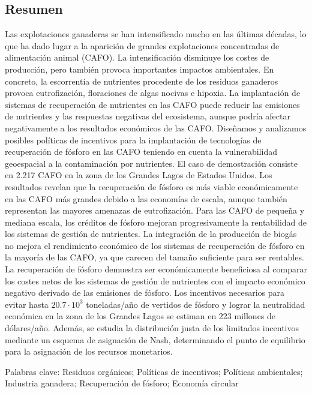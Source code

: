 \begin{refsection}[referencesCh5]
\section*{Resumen}
Las explotaciones ganaderas se han intensificado mucho en las últimas décadas, lo que ha dado lugar a la aparición de grandes explotaciones concentradas de alimentación animal (CAFO). La intensificación disminuye los costes de producción, pero también provoca importantes impactos ambientales. En concreto, la escorrentía de nutrientes procedente de los residuos ganaderos provoca eutrofización, floraciones de algas nocivas e hipoxia. La implantación de sistemas de recuperación de nutrientes en las CAFO puede reducir las emisiones de nutrientes y las respuestas negativas del ecosistema, aunque podría afectar negativamente a los resultados económicos de las CAFO. Diseñamos y analizamos posibles políticas de incentivos para la implantación de tecnologías de recuperación de fósforo en las CAFO teniendo en cuenta la vulnerabilidad geoespacial a la contaminación por nutrientes. El caso de demostración consiste en 2.217 CAFO en la zona de los Grandes Lagos de Estados Unidos. Los resultados revelan que la recuperación de fósforo es más viable económicamente en las CAFO más grandes debido a las economías de escala, aunque también representan las mayores amenazas de eutrofización. Para las CAFO de pequeña y mediana escala, los créditos de fósforo mejoran progresivamente la rentabilidad de los sistemas de gestión de nutrientes. La integración de la producción de biogás no mejora el rendimiento económico de los sistemas de recuperación de fósforo en la mayoría de las CAFO, ya que carecen del tamaño suficiente para ser rentables. La recuperación de fósforo demuestra ser económicamente beneficiosa al comparar los costes netos de los sistemas de gestión de nutrientes con el impacto económico negativo derivado de las emisiones de fósforo. Los incentivos necesarios para evitar hasta $20.7 \cdot 10^3$ toneladas/año de vertidos de fósforo y lograr la neutralidad económica en la zona de los Grandes Lagos se estiman en 223 millones de dólares/año. Además, se estudia la distribución justa de los limitados incentivos mediante un esquema de asignación de Nash, determinando el punto de equilibrio para la asignación de los recursos monetarios.

\bigskip
Palabras clave: Residuos orgánicos; Políticas de incentivos; Políticas ambientales; Industria ganadera; Recuperación de fósforo; Economía circular
\newpage



\end{refsection}
